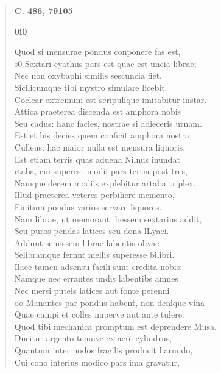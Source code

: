 \documentclass[11pt, a4paper]{report}
\begin{document}
\begin{verse}
     \marginpar{[00]} \begin{center} \textbf{C. 486, 79105} \end{center}\begin{center} \textbf{0i0} \end{center}Quod si mensurae pondus conponere fas est, \\ s0 Sextari cyathus pars est quae est uncia librae; \\ Nec non oxybaphi similis sescuncia fiet, \\ Sicilicumque tibi mystro simulare licebit. \\ Coclear extremum est scripulique imitabitur instar. \\ Attica praeterea discenda est amphora nobis \\ Seu cadus: hanc facies, nostrae si adieceris urnam. \\ Est et bis decies quem conficit amphora nostra \\ Culleus: hac maior nulla est mensura liquoris. \\ Est etiam terris quas aduena Nilnus inundat \\ rtaba, cui superest modii pars tertia post tres, \\ Namque decem modiis explebitur artaba triplex. \\ Illud praeterea veteres perbihere memento, \\ Finitum pondus varios servare liquores. \\ Nam librae, ut memorant, bessem sextarius addit, \\ Seu puros pendas latices seu dona lLyaei. \\ Addunt semissem librae labentis olivae \\ Selibramque fernnt mellis superesse bilibri. \\ Ilaec tamen adsensu facili sunt credita nobis: \\ Namque nec errantes undis labentibs amnes \\ Nec mersi puteis latices aut fonte perenni \\ oo Manantes par pondus habent, non denique vina \\ Quae campi et colles nuperve aut ante tulere. \\ Quod tibi mechanica promptum est deprendere Musa. \\ Ducitur argento tenuive ex aere cylindrus, \\ Quantum inter nodos fragilis producit harundo, \\ Cui cono interius modico pars ima gravatur, \\ 

\end{verse}
\end{document}
